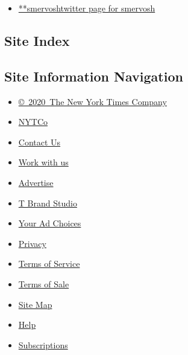 \begin{itemize}
\tightlist
\item
  \href{https://twitter.com/smervosh}{**smervoshtwitter page for
  smervosh}
\end{itemize}

\hypertarget{site-index}{%
\subsection{Site Index}\label{site-index}}

\hypertarget{site-information-navigation}{%
\subsection{Site Information
Navigation}\label{site-information-navigation}}

\begin{itemize}
\tightlist
\item
  \href{https://help.nytimes3xbfgragh.onion/hc/en-us/articles/115014792127-Copyright-notice}{©~2020~The
  New York Times Company}
\end{itemize}

\begin{itemize}
\tightlist
\item
  \href{https://www.nytco.com/}{NYTCo}
\item
  \href{https://help.nytimes3xbfgragh.onion/hc/en-us/articles/115015385887-Contact-Us}{Contact
  Us}
\item
  \href{https://www.nytco.com/careers/}{Work with us}
\item
  \href{https://nytmediakit.com/}{Advertise}
\item
  \href{http://www.tbrandstudio.com/}{T Brand Studio}
\item
  \href{https://www.nytimes3xbfgragh.onion/privacy/cookie-policy\#how-do-i-manage-trackers}{Your
  Ad Choices}
\item
  \href{https://www.nytimes3xbfgragh.onion/privacy}{Privacy}
\item
  \href{https://help.nytimes3xbfgragh.onion/hc/en-us/articles/115014893428-Terms-of-service}{Terms
  of Service}
\item
  \href{https://help.nytimes3xbfgragh.onion/hc/en-us/articles/115014893968-Terms-of-sale}{Terms
  of Sale}
\item
  \href{https://spiderbites.nytimes3xbfgragh.onion}{Site Map}
\item
  \href{https://help.nytimes3xbfgragh.onion/hc/en-us}{Help}
\item
  \href{https://www.nytimes3xbfgragh.onion/subscription?campaignId=37WXW}{Subscriptions}
\end{itemize}
